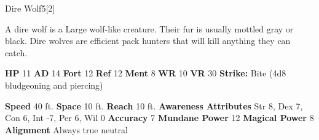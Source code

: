   
  \begin{monsection}{Dire Wolf}{5}[2]
    \vspace{-1em}\vspace{-1em}
    \vspace{0em}

    
        A dire wolf is a Large wolf-like creature.
        Their fur is usually mottled gray or black.
        Dire wolves are efficient pack hunters that will kill anything they can catch.
      

    \begin{spellcontent}
      \begin{spelltargetinginfo}
        \pari \textbf{HP} 11 \monsep
          \textbf{AD} 14 \monsep
          \textbf{Fort} 12 \monsep
          \textbf{Ref} 12 \monsep
          \textbf{Ment} 8
        \pari \textbf{WR} 10 \monsep
        \textbf{VR} 30
        \pari \textbf{Strike:}
            Bite  (4d8 bludgeoning and piercing)
      \end{spelltargetinginfo}
    \end{spellcontent}
    \begin{monsterfooter}
      \pari \textbf{Speed} 40 ft. \monsep
        \textbf{Space} 10 ft. \monsep
        \textbf{Reach} 10 ft.
      \pari \textbf{Awareness} 
      \pari \textbf{Attributes}
        Str 8, Dex 7,
        Con 6, Int -7,
        Per 6, Wil 0
      \pari \textbf{Accuracy} 7 \monsep
        \textbf{Mundane Power} 12 \monsep
      \textbf{Magical Power} 8
      \pari \textbf{Alignment} Always true neutral
    \end{monsterfooter}
  \end{monsection}
  

